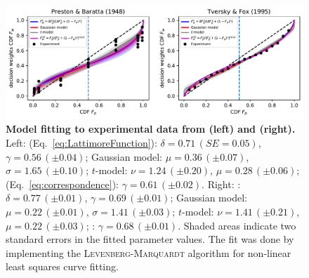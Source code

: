 \documentclass[a4paper, 12pt]{article}
\newcommand{\person}[1]{\textsc{#1}\xspace}
\newcommand{\eref}[1]{(Eq.~\ref{eq:#1})}
\newcommand{\flabel}[1]{\label{fig:#1}}
\begin{document}

\begin{figure}[!htb]
\centering
\includegraphics[width=1.0\textwidth]{./figs/curvefit_PB48_2.pdf}
\caption{\textbf{Model fitting to experimental data from \textcite{PrestonBaratta1948} (left) and \textcite{TverskyFox1995} (right).}
Left: \textcite{LattimoreBakerWitte1992} \eref{LattimoreFunction}: $\delta=0.71\,\left(SE = 0.05\right)$, $\gamma=0.56\,\left(\pm0.04\right)$; Gaussian model: $\mu=0.36\,\left(\pm0.07\right)$, $\sigma=1.65\,\left(\pm0.10\right)$; $t$-model: $\nu=1.24\,\left(\pm0.20\right)$, $\mu=0.28\,\left(\pm0.06\right)$; \textcite{TverskyKahneman1992} \eref{correspondence}: $\gamma=0.61\,\left(\pm0.02\right)$. Right: \textcite{LattimoreBakerWitte1992}: $\delta=0.77\,\left(\pm0.01\right)$, $\gamma=0.69\,\left(\pm0.01\right)$; Gaussian model: $\mu=0.22\,\left(\pm0.01\right)$, $\sigma=1.41\,\left(\pm0.03\right)$; $t$-model: $\nu=1.41\,\left(\pm0.21\right)$, $\mu=0.22\,\left(\pm0.03\right)$; \textcite{TverskyKahneman1992}: $\gamma=0.68\,\left(\pm0.01\right)$. Shaded areas indicate two standard errors in the fitted parameter values. The fit was done by implementing the \person{Levenberg-Marquardt} algorithm \parencite{Levenberg1944} for non-linear least squares curve fitting.
}
\flabel{curvefit}
\end{figure}
\end{document}
